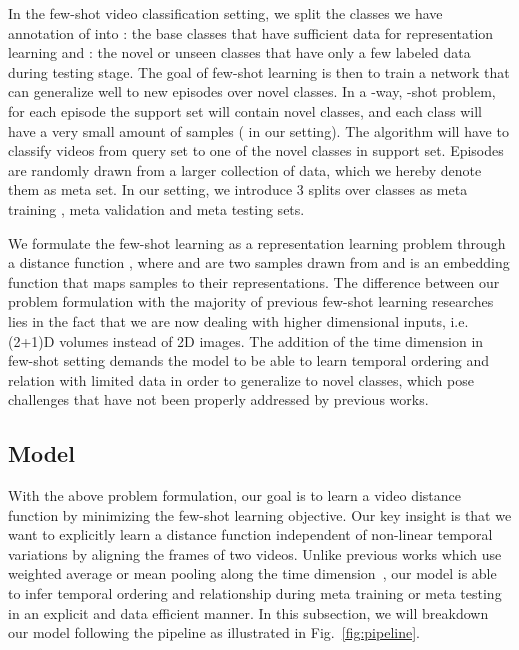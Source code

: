 \documentclass[10pt,twocolumn,letterpaper]{article}
\begin{document}
In the few-shot video classification setting, we split the classes we have annotation of into : the base classes that have sufficient data for representation learning and : the novel or unseen classes that have only a few labeled data during testing stage. The goal of few-shot learning is then to train a network that can generalize well to new episodes over novel classes. In a -way, -shot problem, for each episode the support set will contain  novel classes, and each class will have a very small amount of samples ( in our setting). The algorithm will have to classify videos from query set to one of the novel classes in support set. Episodes are randomly drawn from a larger collection of data, which we hereby denote them as meta set. In our setting, we introduce 3 splits over classes as meta training , meta validation  and meta testing  sets. 

We formulate the few-shot learning as a representation learning problem through a distance function , where  and  are two samples drawn from  and  is an embedding function that maps samples to their representations. The difference between our problem formulation with the majority of previous few-shot learning researches lies in the fact that we are now dealing with higher dimensional inputs, i.e. (2+1)D volumes instead of 2D images. The addition of the time dimension in few-shot setting demands the model to be able to learn temporal ordering and relation with limited data in order to generalize to novel classes, which pose challenges that have not been properly addressed by previous works. 


\subsection{Model}
With the above problem formulation, our goal is to learn a video distance function by minimizing the few-shot learning objective. Our key insight is that we want to explicitly learn a distance function independent of non-linear temporal variations by aligning the frames of two videos. Unlike previous works which use weighted average or mean pooling along the time dimension~\cite{wang2016temporal,tran2015learning,wang2018non,xie2018rethinking,carreira2017quo,zhu2018compound}, our model is able to infer temporal ordering and relationship during meta training or meta testing in an explicit and data efficient manner. In this subsection, we will breakdown our model following the pipeline as illustrated in Fig.~\ref{fig:pipeline}.
\end{document}
